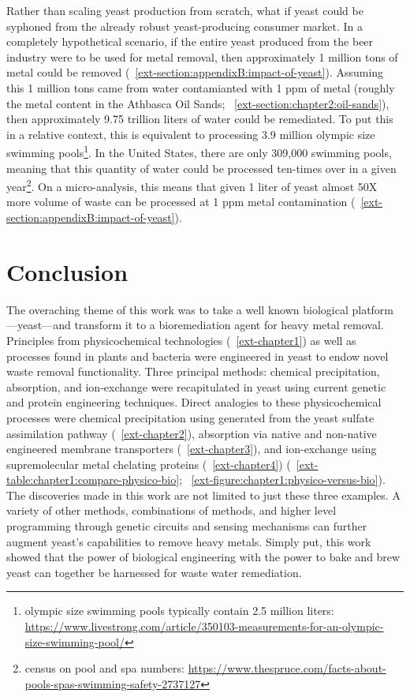 \documentclass[../main/main]{subfiles}
\begin{document}
Rather than scaling yeast production from scratch, what if yeast could be syphoned from the already robust yeast-producing consumer market. In a completely hypothetical scenario, if the entire yeast produced from the beer industry were to be used for metal removal, then approximately 1 million tons of metal could be removed (\APPENDIX~\ref{ext-section:appendixB:impact-of-yeast}). Assuming this 1 million tons came from water contamianted with 1 ppm of metal (roughly the metal content in the Athbasca Oil Sands; \CHAPTER~\ref{ext-section:chapter2:oil-sands}), then approximately 9.75 trillion liters of water could be remediated. To put this in a relative context, this is equivalent to processing 3.9 million olympic size swimming pools\footnote{
	olympic size swimming pools typically contain 2.5 million liters: \url{https://www.livestrong.com/article/350103-measurements-for-an-olympic-size-swimming-pool/}
}. In the United States, there are only 309,000 swimming pools, meaning that this quantity of water could be processed ten-times over in a given year\footnote{
	census on pool and spa numbers: \url{https://www.thespruce.com/facts-about-pools-spas-swimming-safety-2737127}
}. On a micro-analysis, this means that given 1 liter of yeast almost 50X more volume of waste can be processed at 1 ppm metal contamination (\APPENDIX~\ref{ext-section:appendixB:impact-of-yeast}).

\section{Conclusion}
The overaching theme of this work was to take a well known biological platform---yeast---and transform it to a bioremediation agent for heavy metal removal. Principles from physicochemical technologies (\CHAPTER~\ref{ext-chapter1}) as well as processes found in plants and bacteria were engineered in yeast to endow novel waste removal functionality. Three principal methods: chemical precipitation, absorption, and ion-exchange were recapitulated in yeast using current genetic and protein engineering techniques. Direct analogies to these physicochemical processes were chemical precipitation using \HS{} generated from the yeast sulfate assimilation pathway (\CHAPTER~\ref{ext-chapter2}), absorption via native and non-native engineered membrane transporters (\CHAPTER~\ref{ext-chapter3}), and ion-exchange using supremolecular metal chelating proteins (\CHAPTER~\ref{ext-chapter4})
(\TABLE~\ref{ext-table:chapter1:compare-physico-bio}; \FIGURE~\ref{ext-figure:chapter1:physico-versus-bio}).
The discoveries made in this work are not limited to just these three examples. A variety of other methods, combinations of methods, and higher level programming through genetic circuits and sensing mechanisms can further augment yeast's capabilities to remove heavy metals. Simply put, this work showed that the power of biological engineering with the power to bake and brew yeast can together be harnessed for waste water remediation.
\end{document}
